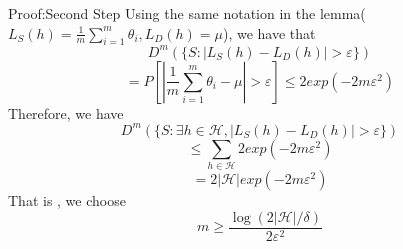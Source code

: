 \documentclass{beamer}
\begin{document}
\begin{frame}{Proof:Second Step}
	Using the same notation in the lemma($L_S(h) = \frac{1}{m} \sum^m_{i=1} \theta_i,L_D(h) = \mu$), we have that 
	\[D^{m}(\{S: |L_S(h) - L_D(h)| > \varepsilon\})\]
\[=P[|\frac{1}{m} \sum^m_{i=1} \theta_i - \mu| > \varepsilon] \leq 2 exp(-2 m \varepsilon^2)\]
Therefore, we have
\[D^{m}(\{S: \exists h \in \mathcal{H}, |L_S(h) - L_D(h)| > \varepsilon\})\]
\[\leq \sum_{h \in \mathcal{H}} 2 exp(-2m \varepsilon^2)\]
\[= 2 |\mathcal{H}| exp(-2m\varepsilon^2)\]
That is , we choose 
\[m  \geq \frac{\log(2|\mathcal{H}|/\delta)}{2\varepsilon^2}\]
\end{frame}
\end{document}
